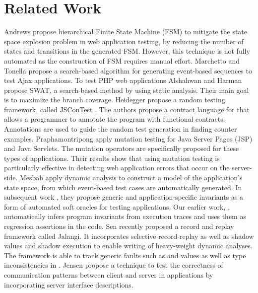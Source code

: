 \section{Related Work} \label{Sec:related}

Andrews \etal \cite{andrews:fms} propose hierarchical Finite State Machine (FSM) to mitigate the state space explosion problem in web application testing, by reducing the number of states and transitions in the generated FSM. However, this technique is not fully automated as the construction of FSM requires manual effort.
Marchetto and Tonella \cite{marchetto:search} propose a search-based algorithm for generating event-based sequences to test Ajax applications. 
To test PHP web applications Alshahwan and Harman \cite{alshahwan:ase11} propose SWAT, a search-based method by using static analysis. Their main goal is to maximize the branch coverage.
Heidegger \etal propose a random testing framework, called JSConTest \cite{heidegger:tools10}. The authors propose a contract language for \javascript that allows a programmer to annotate the program with functional contracts. Annotations are used to guide the random test generation in finding counter examples.
Praphamontripong \etal \cite{praphamontripong:icstw10} apply mutation testing for Java Server Pages (JSP) and Java Servlets. The mutation operators are specifically proposed for these types of applications. Their results show that using mutation testing is particularly effective in detecting web application errors that occur on the server-side.
Mesbah \etal  \cite{mesbah:tweb11} apply dynamic analysis to construct a model of the application's state space, from which event-based test cases are automatically generated. In subsequent work \cite{mesbah:tse12}, they propose generic and application-specific invariants as a form of automated soft oracles for testing \ajax applications.  Our earlier work, \jsart \cite{mirshokraie:icwe12}, automatically infers program invariants from \javascript execution traces and uses them as regression assertions in the code. 
Sen \etal \cite{sen:fse13} recently proposed a record and replay framework called Jalangi. It incorporates selective record-replay as well as shadow values and shadow execution to enable writing of heavy-weight dynamic analyses.
The framework is able to track generic faults such as  and  values as well as type inconsistencies in \javascript. 
Jensen \etal \cite{jensen:fse13} propose a technique to test the correctness of communication patterns between client and server in \ajax applications by incorporating server interface descriptions.
